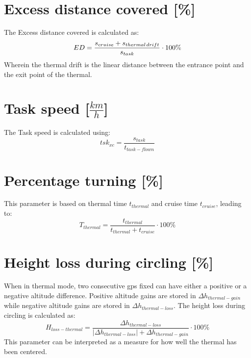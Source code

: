 \section{Excess distance covered [\%]}
The Excess distance covered is calculated as:
\begin{equation}
ED = \frac{{{s_{cruise}} + {s_{thermal{\kern 1pt} drift}}}}{{{s_{task}}}} \cdot 100\% 
\end{equation}
Wherein the thermal drift is the linear distance between the entrance point and the exit point of the thermal.

\section{Task speed [$\frac{km}{h}$]}
The Task speed is calculated using:
\begin{equation}
{tsk_{xc}} = \frac{{{s_{task}}}}{{{t_{task - flown}}}}
\end{equation}

\section{Percentage turning [\%]}
This parameter is based on thermal time ${{t_{thermal}}}$ and cruise time ${{t_{cruise}}} $, leading to:
\begin{equation}
{T_{thermal}} = \frac{{{t_{thermal}}}}{{{t_{thermal}} + {t_{cruise}}}} \cdot 100\% 
\end{equation}

\section{Height loss during circling [\%]}
When in thermal mode, two consecutive gps fixed can have either a positive or a negative altitude difference. Positive altitude gains are stored in $\Delta {h_{thermal-gain}}$ while negative altitude gains are stored in ${\Delta {h_{thermal-loss}}}$. The height loss during circling is calculated as:
\begin{equation}
{H_{loss - thermal}} = \frac{{\Delta {h_{thermal - loss}}}}{{\left| {\Delta {h_{thermal - loss}}} \right| + \Delta {h_{thermal - gain}}}} \cdot 100\% 
\end{equation}
This parameter can be interpreted as a measure for how well the thermal has been centered.
